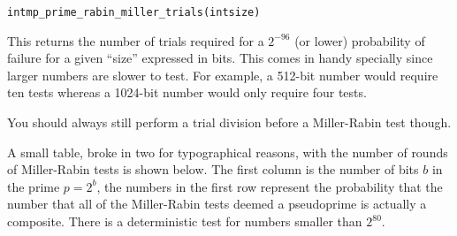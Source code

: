 \documentclass[synpaper]{book}
\begin{document}
\begin{alltt}
int mp_prime_rabin_miller_trials(int size)
\end{alltt}
This returns the number of trials required for a $2^{-96}$ (or lower) probability of failure for a given ``size'' expressed
in bits.  This comes in handy specially since larger numbers are slower to test.  For example, a 512-bit number would
require ten tests whereas a 1024-bit number would only require four tests.

You should always still perform a trial division before a Miller-Rabin test though.

A small table, broke in two for typographical reasons, with the number of rounds of Miller-Rabin tests is shown below.
The first column is the number of bits $b$ in the prime $p = 2^b$, the numbers in the first row represent the
probability that the number that all of the Miller-Rabin tests deemed a pseudoprime is actually a composite. There is a deterministic test for numbers smaller than $2^{80}$.
\end{document}
